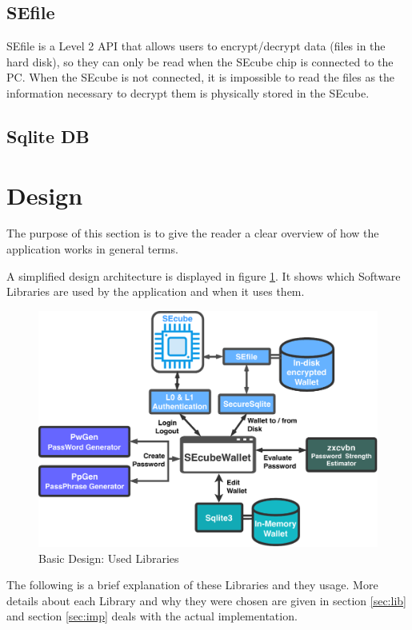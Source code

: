 \subsection{SEfile} 
SEfile is a Level 2 API that allows users to encrypt/decrypt data (files in the hard disk), so they can only be read when the SEcube chip is connected to the PC. When the SEcube is not connected, it is impossible to read the files as the information necessary to decrypt them is physically stored in the SEcube.

\subsection{Sqlite DB}

\section{Design}

The purpose of this section is to give the reader a clear overview of how the application works in general terms. 

A simplified design architecture is displayed in figure \ref{fig:BasicDesign}. It shows which Software Libraries are used by the application and when it uses them.


\begin{figure}[ht]
	\centering
	\includegraphics[width=\textwidth]{chapters/figures/development/BasicDesign.pdf}
	\caption{Basic Design: Used Libraries}
	\label{fig:BasicDesign}
\end{figure}

The following is a brief explanation of these Libraries and they usage. More details about each Library and why they were chosen are given in section \ref{sec:lib} and section \ref{sec:imp} deals with the actual implementation.

